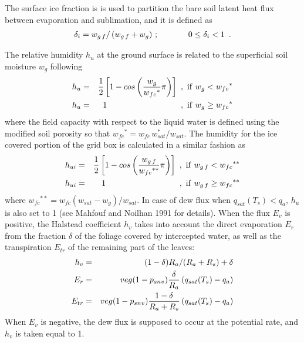 The surface ice fraction is
is used to partition the bare soil latent heat flux
between evaporation and sublimation, and it is defined as
%
\begin{eqnarray}
\delta_i = w_{g\,f}/\left(w_{g\,f}+w_g\right) \,;
\hskip.5in
0 \leq \delta_i < 1   \,\,\,.
\end{eqnarray}

The relative humidity $h_u$ at the ground surface is related to the
superficial soil moisture $w_g$ following
\begin{eqnarray}
h_u &=& {1 \over 2} \left[ 1-cos \left( {w_g \over {w_{fc}}^\ast} \pi \right)
      \right] \ , \ {\rm if} \ w_g < {w_{fc}}^\ast \\
h_u &=& 1 \ \ \ \ \ \ \ \ \ \ \ \ \ \ \ \ \ \
          \ \ \ \ \ \ \ \ \ , \ {\rm if} \ w_g \geq {w_{fc}}^\ast
\end{eqnarray}
%
where the field capacity with respect to the liquid water
is defined using the modified soil porosity so
that ${w_{fc}}^\ast = w_{fc}\,w_{sat}^\ast/w_{sat}$.
The humidity for the ice covered portion of the grid box
is calculated in a similar fashion as
%
\begin{eqnarray}
h_{ui} &=& {1 \over 2} \left[ 1-cos \left( {w_{g\,f} \over {w_{fc}}^{\ast\ast}} \pi \right)
      \right] \ , \ {\rm if} \ w_{g\,f} < {w_{fc}}^{\ast\ast} \\
h_{ui} &=& 1 \ \ \ \ \ \ \ \ \ \ \ \ \ \ \ \ \ \
          \ \ \ \ \ \ \ \ \ , \ {\rm if} \ w_{g\,f} \geq {w_{fc}}^{\ast\ast}
\end{eqnarray}
%
where ${w_{fc}}^{\ast\ast} = w_{fc}(w_{sat}-w_g)/w_{sat}$.
In case of dew flux when $q_{sat}(T_s) < q_a$, $h_u$ is also set
to 1 (see Mahfouf and Noilhan 1991 for details).
When the flux $E_v$ is positive, the Halstead coefficient $h_v$
takes into account the direct evaporation $E_r$ from the fraction
$\delta$ of the foliage covered by intercepted water, as well as
the transpiration $E_{tr}$ of the remaining part of the leaves:
\begin{eqnarray}
h_v &=& (1-\delta) R_a / (R_a+R_s) + \delta \\
E_r &=& veg(1-p_{snv}) {\delta \over R_a}
        \left( q_{sat} (T_s) - q_a \right) \\
E_{tr} &=& veg(1-p_{snv}) {1-\delta \over R_a + R_s}
           \left( q_{sat}(T_s) - q_a \right)
\end{eqnarray}
When $E_v$ is negative, the dew flux is supposed to occur
at the potential rate, and $h_v$ is taken equal to 1.

